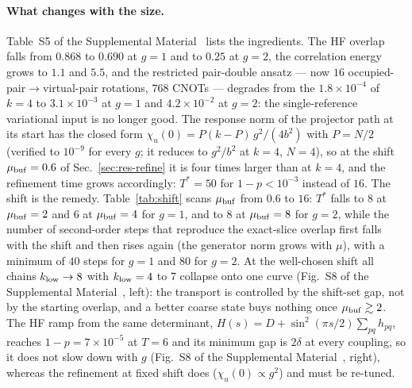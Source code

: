 \documentclass[
  aps,            %
  prc,            %
  reprint,        %
  superscriptaddress,
  floatfix,
  nofootinbib
]{revtex4-2}
\newcommand{\SM}{Supplemental Material~\cite{SM}}
\begin{document}
\paragraph{What changes with the size.}
Table~S5 of the \SM{} lists the ingredients.  The HF overlap falls from
$0.868$ to $0.690$ at $g=1$ and to $0.25$ at $g=2$, the correlation energy
grows to $1.1$ and $5.5$, and the restricted pair-double ansatz --- now
$16$ occupied-pair$\to$virtual-pair rotations, $768$ CNOTs --- degrades from
the $1.8\times10^{-4}$ of $k=4$ to $3.1\times10^{-3}$ at $g=1$ and
$4.2\times10^{-2}$ at $g=2$: the single-reference variational input is no
longer good.  The response norm of the projector path at its start has the
closed form $\chi_u(0)=P(k-P)\,g^2/(4b^2)$ with $P=N/2$ (verified to
$10^{-9}$ for every $g$; it reduces to $g^2/b^2$ at $k=4$, $N=4$), so at
the shift $\mu_{\rm buf}=0.6$ of Sec.~\ref{sec:res-refine} it is four
times larger than at $k=4$, and the refinement time grows accordingly:
$T^*=50$ for $1-p<10^{-3}$ instead of $16$.  The shift is the remedy.
Table~\ref{tab:shift} scans $\mu_{\rm buf}$ from $0.6$ to $16$: $T^*$ falls to $8$ at $\mu_{\rm buf}=2$ and $6$ at $\mu_{\rm buf}=4$
for $g=1$, and to $8$ at $\mu_{\rm buf}=8$ for $g=2$, while the number of
second-order steps that reproduce the exact-slice overlap first falls with
the shift and then rises again (the generator norm grows with $\mu$), with a
minimum of $40$ steps for $g=1$ and $80$ for $g=2$.  At the well-chosen
shift all chains $k_{\rm low}\to8$ with $k_{\rm low}=4$ to $7$ collapse onto
one curve (Fig.~S8 of the \SM{}, left): the transport is controlled by the
shift-set gap, not by the starting overlap, and a better coarse state buys
nothing once $\mu_{\rm buf}\gtrsim2$.  The HF ramp from the same
determinant, $H(s)=D+\sin^2(\pi s/2)\sum_{pq}h_{pq}$, reaches
$1-p=7\times10^{-5}$ at $T=6$ and its minimum gap is $2\delta$ at every
coupling, so it does not slow down with $g$ (Fig.~S8 of the \SM{}, right),
whereas the refinement at fixed shift does ($\chi_u(0)\propto g^2$) and must
be re-tuned.
\end{document}

